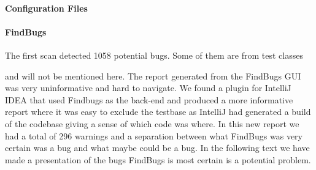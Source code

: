 \documentclass{report} %
\begin{document}
\paragraph{Configuration Files}  

\paragraph{FindBugs}

  The first scan detected 1058 potential bugs. Some of them are from test classes

  and will not be mentioned here. The report generated from the FindBugs GUI was
  very uninformative and hard to navigate. We found a plugin for IntelliJ IDEA
  that used Findbugs as the back-end and produced a more informative report
  where it was easy to exclude the testbase as IntelliJ had generated a build of the
  codebase giving a sense of which code was where. In this new report we
  had a total of 296 warnings and a separation between what FindBugs was very
  certain was a bug and what maybe could be a bug. In the following text we have
  made a presentation of the bugs FindBugs is most certain is a potential
  problem.
\end{document}
